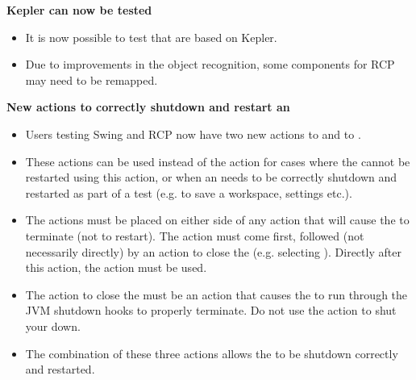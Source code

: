\textbf{Kepler \gdauts{} can now be tested}
\begin{itemize}
\item It is now possible to test \gdauts{} that are based on Kepler.
\item Due to improvements in the object recognition, some components for RCP \gdauts{} may need to be remapped.
\end{itemize}

\textbf{New actions to correctly shutdown and restart an \gdaut{}}
\begin{itemize}
\item Users testing Swing and RCP \gdauts{} now have two new actions to  and to . 
\item These actions can be used instead of the  action for cases where the \gdaut{} cannot be restarted using this action, or when an \gdaut{} needs to be correctly shutdown and restarted as part of a test (e.g. to save a workspace, settings etc.).
\item The actions must be placed on either side of any action that will cause the \gdaut{} to terminate (not to restart). The  action must come first, followed (not necessarily directly) by an action to close the \gdaut{} (e.g. selecting ). Directly after this action, the  action must be used.
\item The action to close the \gdaut{} must be an action that causes the \gdaut{} to run through the JVM shutdown hooks to properly terminate. Do not use the  action to shut your \gdaut{} down.
\item The combination of these three actions allows the \gdaut{} to be shutdown correctly and restarted. 
\end{itemize}
